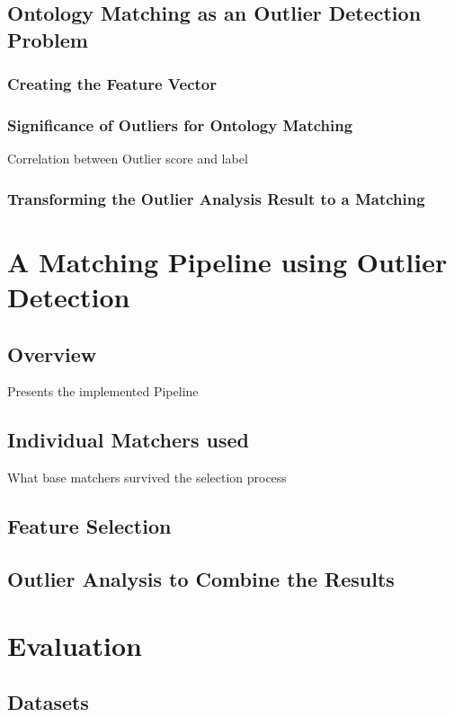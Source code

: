 \documentclass[11pt,titlepage,oneside,openany,a4paper]{report}
\begin{document}
\section{Ontology Matching as an Outlier Detection Problem}
\subsection{Creating the Feature Vector}
\subsection{Significance of Outliers for Ontology Matching}
Correlation between Outlier score and label
\subsection{Transforming the Outlier Analysis Result to a Matching}


\chapter{A Matching Pipeline using Outlier Detection}

\section{Overview}
Presents the implemented Pipeline
\section{Individual Matchers used}
What base matchers survived the selection process
\section{Feature Selection}

\section{Outlier Analysis  to Combine the Results}



\chapter{Evaluation}
\section{Datasets}
\end{document}
